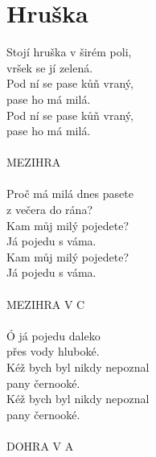 \section{Hruška}
Stojí hruška v širém poli,\\
vršek se jí zelená.\\
Pod ní se pase kůň vraný,\\
pase ho má milá.\\
Pod ní se pase kůň vraný,\\
pase ho má milá.\\
\\
MEZIHRA\\
\\
Proč má milá dnes pasete\\
z večera do rána?\\
Kam můj milý pojedete?\\
Já pojedu s váma.\\
Kam můj milý pojedete?\\
Já pojedu s váma.\\
\\
MEZIHRA V C\\
\\
Ó já pojedu daleko\\
přes vody hluboké.\\
Kéž bych byl nikdy nepoznal\\
pany černooké.\\
Kéž bych byl nikdy nepoznal\\
pany černooké.\\
\\
DOHRA V A